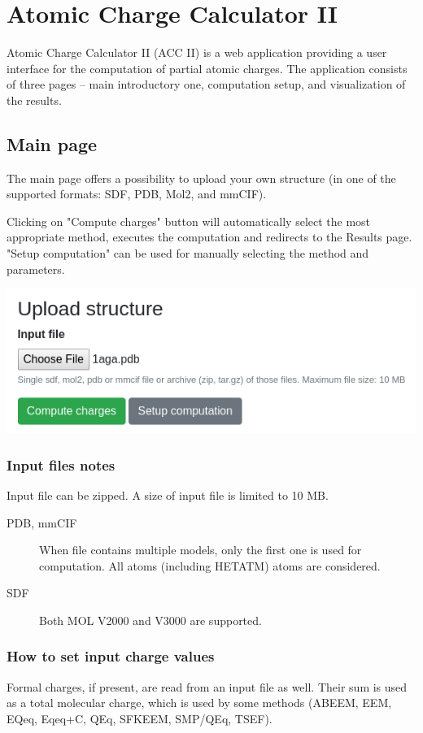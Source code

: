 \documentclass[oneside]{memoir}
\begin{document}
\chapter*{Atomic Charge Calculator \textcolor{ACCgreen}{II}}
Atomic Charge Calculator II (ACC II) is a web application providing a user interface for the computation of partial atomic charges. The application consists of three pages – main introductory one, computation setup, and visualization of the results.

\section*{Main page}
The main page offers a possibility to upload your own structure (in one of the supported formats: SDF, PDB, Mol2, and mmCIF).

Clicking on "Compute charges" button will automatically select the most appropriate method, executes the computation and redirects to the Results page. "Setup computation" can be used for manually selecting the method and parameters.

\begin{center}
    \includegraphics[width=.5\linewidth]{images/upload.png}
\end{center}

\subsection*{Input files notes}
Input file can be zipped. A size of input file is limited to 10 MB.
\begin{description}
\item[PDB, mmCIF] When file contains multiple models, only the first one is used for computation. All atoms (including HETATM) atoms are considered.
\item[SDF] Both MOL V2000 and V3000 are supported.
\end{description}

\subsection*{How to set input charge values}

Formal charges, if present, are read from an input file as well. Their sum is used as a total molecular charge, which is used by some methods (ABEEM, EEM, EQeq, Eqeq+C, QEq, SFKEEM, SMP/QEq, TSEF).
\end{document}
